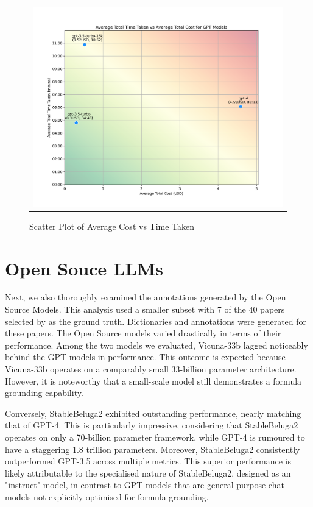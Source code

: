 \begin{figure}[htpb]
  \centering
  \begin{tabular}{c}
  \includegraphics[width=14cm]{images/gpt-time-v-cost.png}
  \end{tabular}
  \caption[Cost vs Time]{Scatter Plot of Average Cost vs Time Taken}\label{fig:gpt-time-v-cost}
\end{figure}


\section{Open Souce LLMs}

Next, we also thoroughly examined the annotations generated by the Open Source Models. This analysis used a smaller subset with 7 of the 40 papers selected by \citet{asakura2022building} as the ground truth. Dictionaries and annotations were generated for these papers. The Open Source models varied drastically in terms of their performance. Among the two models we evaluated, Vicuna-33b lagged noticeably behind the GPT models in performance. This outcome is expected because Vicuna-33b operates on a comparably small 33-billion parameter architecture. However, it is noteworthy that a small-scale model still demonstrates a formula grounding capability.

Conversely, StableBeluga2 exhibited outstanding performance, nearly matching that of GPT-4. This is particularly impressive, considering that StableBeluga2 operates on only a 70-billion parameter framework, while GPT-4 is rumoured to have a staggering 1.8 trillion parameters. Moreover, StableBeluga2 consistently outperformed GPT-3.5 across multiple metrics. This superior performance is likely attributable to the specialised nature of StableBeluga2, designed as an "instruct" model, in contrast to GPT models that are general-purpose chat models not explicitly optimised for formula grounding.

